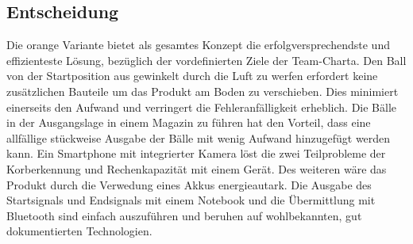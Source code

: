 \subsection{Entscheidung}
Die orange Variante bietet als gesamtes Konzept die erfolgversprechendste und effizienteste Lösung, bezüglich der vordefinierten Ziele der Team-Charta. Den Ball von der Startposition aus gewinkelt durch die Luft zu werfen erfordert keine zusätzlichen Bauteile um das Produkt am Boden zu verschieben. Dies minimiert einerseits den Aufwand und verringert die Fehleranfälligkeit erheblich. Die Bälle in der Ausgangslage in einem Magazin zu führen hat den Vorteil, dass eine allfällige stückweise Ausgabe der Bälle mit wenig Aufwand hinzugefügt werden kann. Ein Smartphone mit integrierter Kamera löst die zwei Teilprobleme der Korberkennung und Rechenkapazität mit einem Gerät. Des weiteren wäre das Produkt durch die Verwedung eines Akkus energieautark. Die Ausgabe des Startsignals und Endsignals mit einem Notebook und die Übermittlung mit Bluetooth sind einfach auszuführen und beruhen auf wohlbekannten, gut dokumentierten Technologien.